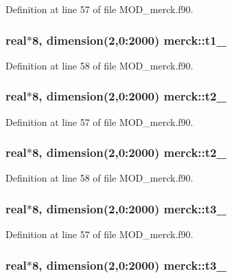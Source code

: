 Definition at line 57 of file M\-O\-D\-\_\-merck.\-f90.

\hypertarget{classmerck_a8bc86e67b70d3bf5f64dd42af649b029}{
\subsubsection[{t1\-\_\-2}]{\setlength{\rightskip}{0pt plus 5cm}real$\ast$8, dimension(2,0\-:2000) merck\-::t1\-\_}}\label{classmerck_a8bc86e67b70d3bf5f64dd42af649b029}


Definition at line 58 of file M\-O\-D\-\_\-merck.\-f90.

\hypertarget{classmerck_a6dc3f447e2e06723a00ab70628bc0366}{
\subsubsection[{t2\-\_\-1}]{\setlength{\rightskip}{0pt plus 5cm}real$\ast$8, dimension(2,0\-:2000) merck\-::t2\-\_}}\label{classmerck_a6dc3f447e2e06723a00ab70628bc0366}


Definition at line 57 of file M\-O\-D\-\_\-merck.\-f90.

\hypertarget{classmerck_a6b3c6efb5313d650b4f54c20adfa9277}{
\subsubsection[{t2\-\_\-2}]{\setlength{\rightskip}{0pt plus 5cm}real$\ast$8, dimension(2,0\-:2000) merck\-::t2\-\_}}\label{classmerck_a6b3c6efb5313d650b4f54c20adfa9277}


Definition at line 58 of file M\-O\-D\-\_\-merck.\-f90.

\hypertarget{classmerck_a7e6fcfd46a21e8ae8c9a624e91648249}{
\subsubsection[{t3\-\_\-1}]{\setlength{\rightskip}{0pt plus 5cm}real$\ast$8, dimension(2,0\-:2000) merck\-::t3\-\_}}\label{classmerck_a7e6fcfd46a21e8ae8c9a624e91648249}


Definition at line 57 of file M\-O\-D\-\_\-merck.\-f90.

\hypertarget{classmerck_af1f812e006b64ca36df99613700e9142}{
\subsubsection[{t3\-\_\-2}]{\setlength{\rightskip}{0pt plus 5cm}real$\ast$8, dimension(2,0\-:2000) merck\-::t3\-\_}}\label{classmerck_af1f812e006b64ca36df99613700e9142}


